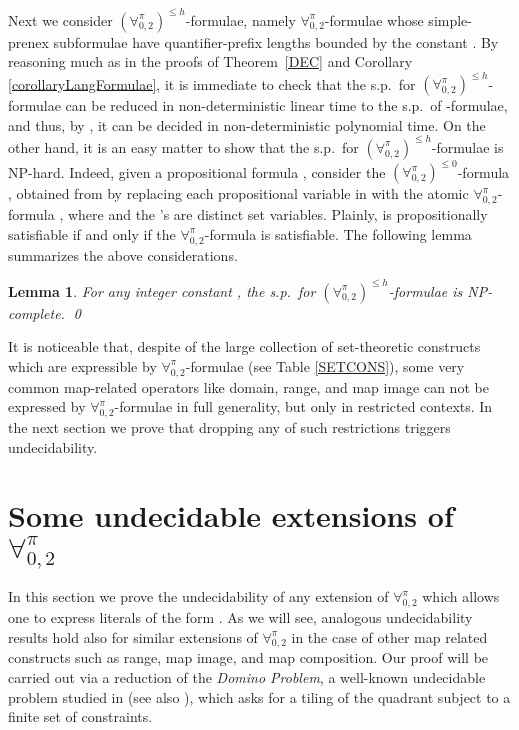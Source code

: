 \documentclass[submission,copyright,creativecommons]{eptcs}
\newtheorem{lemma}{Lemma}
\newcommand{\Lang}{\ensuremath{\mathbf{\forall}^{\pi}_{0,2}}\xspace}
\newcommand{\LangBounded}[1]{\ensuremath{(\Lang)^{\leq #1}}\xspace}
\newcommand{\corr}[1]{#1}
\begin{document}
Next we consider \LangBounded{h}-formulae, namely \Lang-formulae whose
simple-prenex subformulae have \corr{quantifier-prefix lengths} bounded by
the constant .
By reasoning much as in the proofs of Theorem~\ref{DEC} and Corollary
\ref{corollaryLangFormulae}, it is immediate to check that the s.p.\
for \LangBounded{h}-formulae can be reduced in non-deterministic
linear time to the s.p.\ of -formulae, and
thus, by \cite[Corollary~4]{CanLonNic2011}, it can be decided in
non-deterministic polynomial time.
On the other hand, it is an easy matter to show that the s.p.\ for
\LangBounded{h}-formulae is \textsc{NP}-hard.  Indeed, given a
propositional formula , consider the \LangBounded{0}-formula
, obtained from  by replacing each propositional variable
 in  with the atomic \Lang-formula , where  and the 's are distinct set variables.
Plainly,  is propositionally satisfiable if and only if the
\Lang-formula  is satisfiable.
The following lemma summarizes the above considerations.

\begin{lemma}\label{NP}
For any integer constant , the s.p.\ for
\LangBounded{h}-formulae is \textsc{NP}-complete.  \qed
\end{lemma}

It is noticeable that, despite of the large collection of
set-theoretic constructs which are expressible by \Lang-formulae (see
Table \ref{SETCONS}), some very common map-related operators like
domain, range, and map image can not be expressed by \Lang-formulae in
full generality, but only in restricted contexts.  In the next section
we prove that dropping any of such restrictions triggers
undecidability.

\section{Some undecidable extensions of \Lang}\label{UNDEC}

In this section we prove the undecidability of any extension of \Lang
which allows one to express literals of the form .  As we will see, analogous undecidability results hold also
for similar extensions of \Lang in the case of other map related
constructs such as range, map image, and map composition.
Our proof will be carried out via a reduction of the \emph{Domino
Problem}, a well-known undecidable problem studied in \cite{Ber1966}
\corr{(see also \cite{BorGraGur1997})},
which asks for a tiling of the quadrant  subject to
a finite set of constraints.
\end{document}
